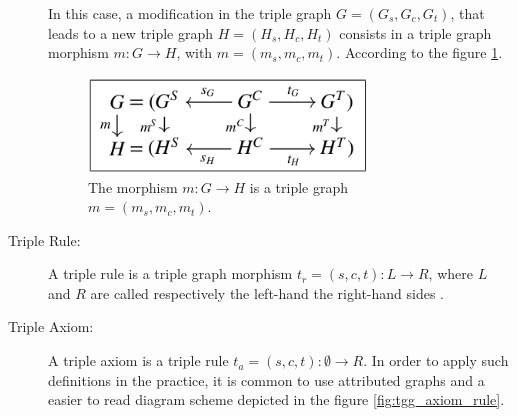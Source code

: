\documentclass[tuberlin,cic,tc,english,noabntcite]{iiufrgs}
\begin{document}
\begin{description}
	In this case, a modification in the triple graph $G = (G_s,G_c,G_t)$, that leads to a new triple graph $H = (H_s,H_c,H_t)$ consists in a triple graph morphism $m: G \rightarrow H$, with $m = (m_s,m_c,m_t)$. According to the figure \ref{fig:tg_morphism}.

	\begin{figure}[h]
	    \caption{The morphism $m: G \rightarrow H$ is a triple graph $m = (m_s,m_c,m_t)$.}
	    \begin{center}
	        \includegraphics[width=20em]{tg_morphism}   
	    \end{center}
	    \label{fig:tg_morphism}
	\end{figure}

	\item[Triple Rule:] A triple rule is a triple graph morphism $t_r = (s, c, t) : L \rightarrow R$, where $L$ and $R$ are called respectively the left-hand the right-hand sides \citep{ehrig2007information}.
	
	\item[Triple Axiom:] A triple axiom is a triple rule $t_a = (s, c, t) : \emptyset \rightarrow R$. In order to apply such definitions in the practice, it is common to use attributed graphs and a easier to read diagram scheme depicted in the figure \ref{fig:tgg_axiom_rule}.



\end{description}
\end{document}

